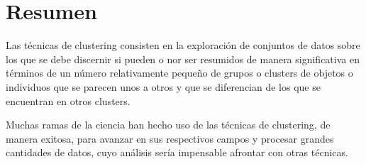 \section{Resumen}

Las técnicas de clustering consisten en la exploración de conjuntos de datos sobre los que se debe discernir si pueden o nor ser resumidos de manera significativa en términos de un número relativamente pequeño de grupos o clusters de objetos o individuos que se parecen unos a otros y que se diferencian de los que se encuentran en otros clusters.

Muchas ramas de la ciencia han hecho uso de las técnicas de clustering, de manera exitosa, para avanzar en sus respectivos campos y procesar grandes cantidades de datos, cuyo análisis sería impensable afrontar con otras técnicas.






















